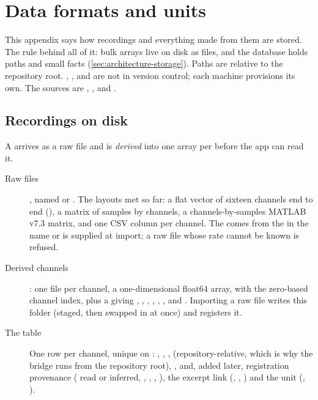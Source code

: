 \chapter{Data formats and units}\label{app:data}
This appendix says how recordings and everything made from them are stored. The rule behind all of
it: bulk arrays live on disk as files, and the database holds paths and small facts
(\cref{sec:architecture-storage}). Paths are relative to the repository root. ,
,  and  are not in version control; each machine
provisions its own. The sources are ,
,  and .

\section{Recordings on disk}\label{sec:data-recordings}
A  arrives as a raw file and is \emph{derived} into one array per
 before the app can read it.

\begin{description}
\item[Raw files] , named  or . The layouts met
  so far: a flat vector of sixteen channels end to end (), a matrix of
  samples by channels, a channels-by-samples MATLAB v7.3 matrix, and one CSV column per channel.
  The  comes from the  in the name or is supplied at
  import; a raw file whose rate cannot be known is refused.
\item[Derived channels] : one file  per channel,
  a one-dimensional float64 array, with  the zero-based channel index, plus a
   giving , , ,
  , , ,  and .
  Importing a raw file writes this folder (staged, then swapped in at once) and registers it.
\item[The  table] One row per channel, unique on :
  , , ,  (repository-relative, which is
  why the bridge runs from the repository root), , and, added later, registration
  provenance ( read or inferred, , ,
  , ), the excerpt link (,
  , ) and the unit (, ).
\end{description}

